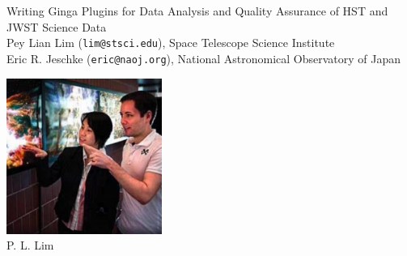 \documentclass[]{article}
\begin{document}
\begin{minipage}[t]{0.8\linewidth}
  \vspace{0pt}
\begin{center}
{\huge Writing Ginga Plugins for Data Analysis and Quality Assurance of
            HST and JWST Science Data }\\

\vspace*{1.5em}
Pey Lian Lim ({\tt lim@stsci.edu}),
Space Telescope Science Institute \\
Eric R. Jeschke ({\tt eric@naoj.org}),
National Astronomical Observatory of Japan
\end{center}
\end{minipage}
\hfill
\begin{minipage}[t]{0.15\linewidth}
  \vspace{0pt}
  \includegraphics[width=2in]{pllim} \\
  {P. L. Lim}
\end{minipage}
\vspace*{2em}

\noindent\hrulefill

\raggedcolumns
\setlength{\columnseprule}{1pt}
\setlength{\columnsep}{2em}
\end{document}
